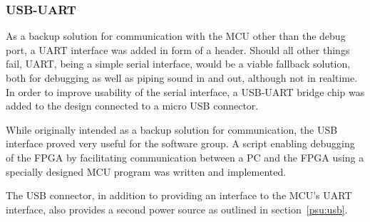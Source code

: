 
\subsubsection{USB-UART}

As a backup solution for communication with the MCU other than the debug port,
a UART interface was added in form of a header. Should all other things fail,
UART, being a simple serial interface, would be a viable fallback solution, both
for debugging as well as piping sound in and out, although not in realtime. In
order to improve usability of the serial interface, a USB-UART bridge chip was
added to the design connected to a micro USB connector.

While originally intended as a backup solution for communication, the USB
interface proved very useful for the software group. A script enabling debugging
of the FPGA by facilitating communication between a PC and the FPGA using a
specially designed MCU program was written and implemented. 

The USB connector, in addition to providing an interface to the MCU's UART
interface, also provides a second power source as outlined in
section~\ref{psu:usb}.